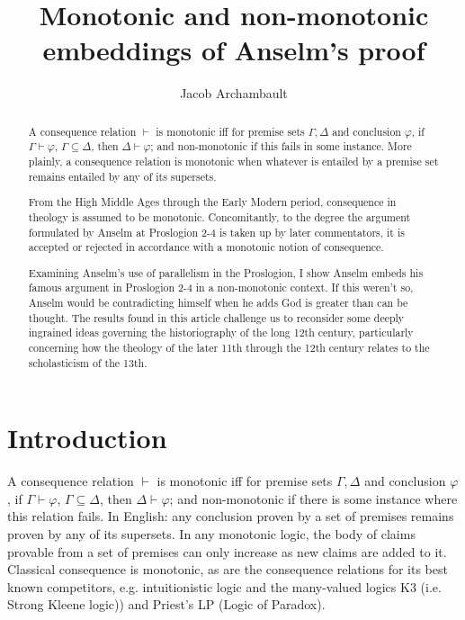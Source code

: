 \documentclass[]{amsart}
\title{Monotonic and non-monotonic embeddings of Anselm's proof}
\author{Jacob Archambault}
\begin{document}
\maketitle

\begin{abstract}
A consequence relation $\vdash$ is monotonic iff for premise sets $\Gamma, \Delta$ and conclusion $\varphi$, if $\Gamma \vdash \varphi$, $\Gamma \subseteq \Delta$, then $\Delta \vdash \varphi$; and non-monotonic if this fails in some instance.  More plainly, a consequence relation is monotonic when whatever is entailed by a premise set remains entailed by any of its supersets. 

From the High Middle Ages through the Early Modern period, consequence in theology is assumed to be monotonic. Concomitantly, to the degree the argument formulated by Anselm at Proslogion 2-4 is taken up by later commentators, it is accepted or rejected in accordance with a monotonic notion of consequence.

Examining Anselm's use of parallelism in the Proslogion, I show Anselm embeds his famous argument in Proslogion 2-4 in a non-monotonic context. If this weren't so, Anselm would be contradicting himself when he adds God is greater than can be thought. The results found in this article challenge us to reconsider some deeply ingrained ideas governing the historiography of the long 12th century, particularly concerning how the theology of the later 11th through the 12th century relates to the scholasticism of the 13th.
\end{abstract}

\section{Introduction}
A consequence relation $\vdash$ is monotonic iff for premise sets $\Gamma, \Delta$ and conclusion $\varphi$, if $\Gamma \vdash \varphi$, $\Gamma \subseteq \Delta$, then $\Delta \vdash \varphi$; and non-monotonic if there is some instance where this relation fails. In English: any conclusion proven by a set of premises remains proven by any of its supersets. In any monotonic logic, the body of claims provable from a set of premises can only increase as new claims are added to it. Classical consequence is monotonic, as are the consequence relations for its best known competitors, e.g. intuitionistic logic and the many-valued logics K3 (i.e. Strong Kleene logic)) and Priest's LP (Logic of Paradox).
\end{document}
